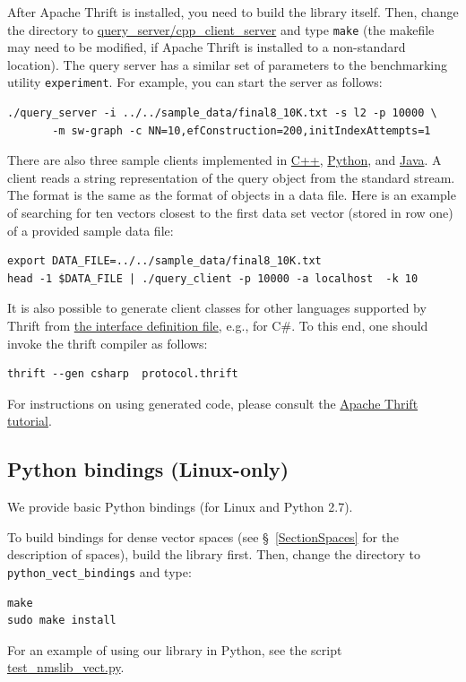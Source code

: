 \documentclass[runningheads,a4paper]{llncs}
\newcommand{\replocfile}{https://github.com/searchivarius/nmslib/blob/v1.5/}
\newcommand{\ttt}[1]{\texttt{#1}}
\begin{document}
{After Apache Thrift is installed, you need to build the library itself. Then, change the directory
to \href{\replocfile query_server/cpp_client_server}{query\_server/cpp\_client\_server} and type \ttt{make} (the makefile 
may need to be modified, if Apache Thrift is installed to a non-standard location).
The query server has a similar set of parameters to the benchmarking utility \ttt{experiment}.  For example,
you can start the server as follows:
\begin{verbatim}
./query_server -i ../../sample_data/final8_10K.txt -s l2 -p 10000 \
       -m sw-graph -c NN=10,efConstruction=200,initIndexAttempts=1
\end{verbatim}

There are also three sample clients implemented in \href{\replocfile query_server/cpp_client_server}{C++}, \href{\replocfile query_server/python_client/}{Python},
and \href{\replocfile query_server/java_client/}{Java}. 
A client reads a string representation of the query object from the standard stream.
The format is the same as the format of objects in a data file. 
Here is an example of searching for ten vectors closest to the first data set vector (stored in row one) of a provided sample data file:
\begin{verbatim}
export DATA_FILE=../../sample_data/final8_10K.txt
head -1 $DATA_FILE | ./query_client -p 10000 -a localhost  -k 10
\end{verbatim}

It is also possible to generate client classes for other languages supported by Thrift from 
\href{\replocfile query_server/protocol.thrift}{the interface definition file}, e.g., for C\#. To this end, one should invoke the thrift compiler as follows:
\begin{verbatim}
thrift --gen csharp  protocol.thrift
\end{verbatim}
For instructions on using generated code, please consult the \href{https://thrift.apache.org/tutorial/}{Apache Thrift tutorial}.

\subsection{Python bindings (Linux-only)}\label{SectionPythonBind}
We provide basic Python bindings (for Linux and Python 2.7). 


To build bindings for dense vector spaces (see \S~\ref{SectionSpaces} for the description of spaces), build the library first.
Then, change the directory to \ttt{python\_vect\_bindings} and type:
\begin{verbatim}
make
sudo make install
\end{verbatim} 
For an example of using our library in Python, see the script  \href{\replocfile python_vect_bindings/test_nmslib_vect.py}{test\_nmslib\_vect.py}.

}
\end{document}
